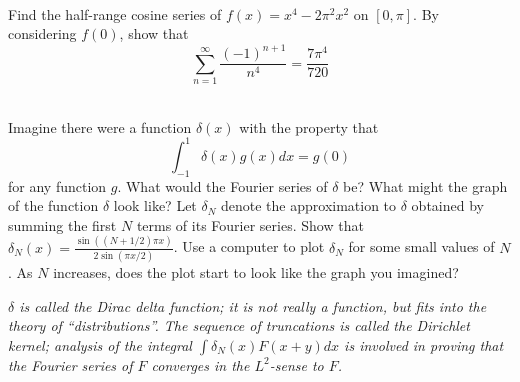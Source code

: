 \documentclass[12pt]{article}
\begin{document}
\vspace{0.5cm}

\begin{question}\ \\
Find the half-range cosine series of $f(x)=x^4-2\pi^2x^2$ on $[0,\pi]$. By considering $f(0)$, show that
\[\sum_{n=1}^{\infty}\frac{(-1)^{n+1}}{n^4}=\frac{7\pi^4}{720}\]
\end{question}

\vspace{0.5cm}

\begin{question}\ \\
Imagine there were a function $\delta(x)$ with the property that
\[\int_{-1}^1\delta(x)g(x)dx=g(0)\]
for any function $g$. What would the Fourier series of $\delta$ be? What might the graph of the function $\delta$ look like? Let $\delta_N$ denote the approximation to $\delta$ obtained by summing the first $N$ terms of its Fourier series. Show that $\delta_N(x)=\frac{\sin((N+1/2)\pi x)}{2\sin(\pi x/2)}$. Use a computer to plot $\delta_N$ for some small values of $N$. As $N$ increases, does the plot start to look like the graph you imagined?

{\em $\delta$ is called the Dirac delta function; it is not really a function, but fits into the theory of ``distributions''. The sequence of truncations is called the Dirichlet kernel; analysis of the integral $\int\delta_N(x)F(x+y)dx$ is involved in proving that the Fourier series of $F$ converges in the $L^2$-sense to $F$.}
\end{question}

\iffalse
\end{document}
